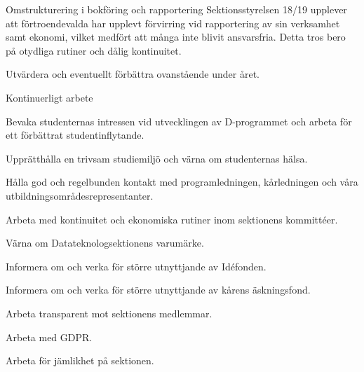 \documentclass{dtek}
\begin{document}
  \begin{FokusPunkt}{Omstrukturering i bokföring och rapportering}{
    Sektionsstyrelsen 18/19 upplever att förtroendevalda har upplevt förvirring
    vid rapportering av sin verksamhet samt ekonomi, vilket medfört att många
    inte blivit ansvarsfria. Detta tros bero på otydliga rutiner och dålig
    kontinuitet.
  }
    \item Utvärdera och eventuellt förbättra ovanstående under året.
  \end{FokusPunkt}

  \begin{FokusPunkt}{Kontinuerligt arbete}
    \item Bevaka studenternas intressen vid utvecklingen av D-programmet och
      arbeta för ett förbättrat studentinflytande.
    \item Upprätthålla en trivsam studiemiljö och värna om studenternas hälsa.
    \item Hålla god och regelbunden kontakt med programledningen, kårledningen
      och våra utbildningsområdesrepresentanter.
    \item Arbeta med kontinuitet och ekonomiska rutiner inom sektionens
      kommittéer.
    \item Värna om Datateknologsektionens varumärke.
    \item Informera om och verka för större utnyttjande av Idéfonden.
    \item Informera om och verka för större utnyttjande av kårens äskningsfond.
    \item Arbeta transparent mot sektionens medlemmar.
    \item Arbeta med GDPR.
    \item Arbeta för jämlikhet på sektionen.
  \end{FokusPunkt}
\end{document}
